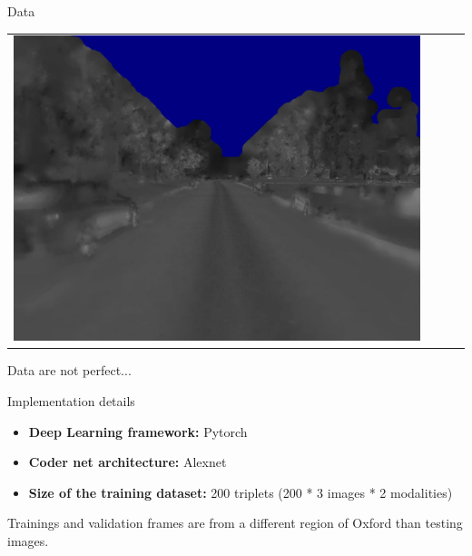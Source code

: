 \begin{frame}{Data}
\begin{tabular}{c c c c}
		\includegraphics[width=\widthcase]{images/dataset/ref_000052_stereo_centre.jpg} \\		
	\end{tabular}
	\vfill
	Data are not perfect...
\end{frame}

\begin{frame}{Implementation details}
	\begin{itemize}
		\item[] \textbf{Deep Learning framework:} Pytorch
		\item[] \textbf{Coder net architecture:} Alexnet
		\item[] \textbf{Size of the training dataset:} 200 triplets (200 * 3 images * 2 modalities)
	\end{itemize}
	
	Trainings and validation frames are from a different region of Oxford than testing images.
\end{frame}


